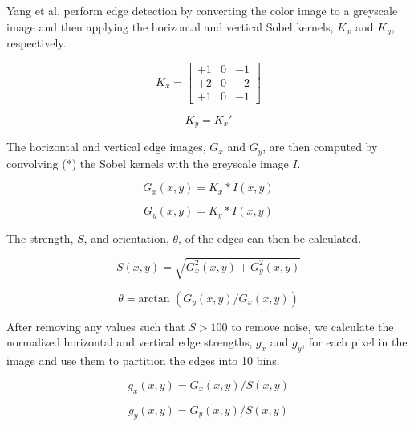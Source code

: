 \documentclass[12pt]{article}
\begin{document}
Yang et al. \cite{hybrid} perform edge detection by converting the color image to a greyscale image and then applying the horizontal and vertical Sobel kernels, $K_x$ and $K_y$, respectively.

\begin{equation}
K_x = \left [ \begin{array}{ccc}
+1 & 0 & -1 \\
+2 & 0 & -2 \\
+1 & 0 & -1 \end{array} \right ] 
\label{eq:horzsobel}
\end{equation}

\begin{equation}
K_y = K_x'
\label{eq:vertsobel}
\end{equation}

The horizontal and vertical edge images, $G_x$ and $G_y$, are then computed by convolving ($*$) the Sobel kernels with the greyscale image $I$.

\begin{equation}
G_x(x,y) = K_x * I(x,y)
\label{eq:horzedgeimg}
\end{equation}

\begin{equation}
G_y(x,y) = K_y * I(x,y)
\label{eq:vertedgeimg}
\end{equation}

The strength, $S$, and orientation, $\theta$, of the edges can then be calculated.

\begin{equation}
S(x,y) = \sqrt{G_x^2(x,y) + G_y^2(x,y)}
\label{eq:edgestrength}
\end{equation}

\begin{equation}
\theta = \text{arctan } (G_y(x,y) / G_x(x,y))
\label{eq:edgeorient}
\end{equation}

After removing any values such that $S > 100$  to remove noise, we calculate the normalized horizontal and vertical edge strengths, $g_x$ and $g_y$, for each pixel in the image and use them to partition the edges into 10 bins.

\begin{equation}
g_x(x,y) = G_x(x,y)/S(x,y)
\label{eq:horznormedgestrength}
\end{equation}

\begin{equation}
g_y(x,y) = G_y(x,y)/S(x,y)
\label{eq:vertnormedgestrength}
\end{equation}
\end{document}
